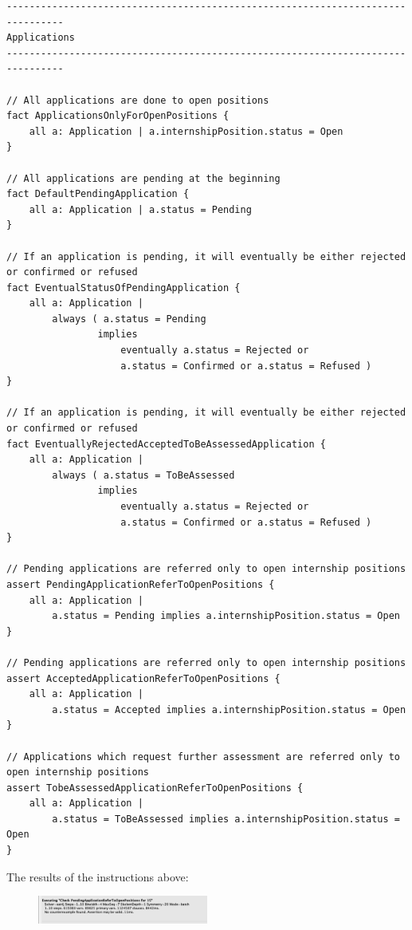 \begin{verbatim}
--------------------------------------------------------------------------------
Applications
--------------------------------------------------------------------------------

// All applications are done to open positions
fact ApplicationsOnlyForOpenPositions {
    all a: Application | a.internshipPosition.status = Open
}

// All applications are pending at the beginning
fact DefaultPendingApplication {
    all a: Application | a.status = Pending
}

// If an application is pending, it will eventually be either rejected or confirmed or refused
fact EventualStatusOfPendingApplication {
    all a: Application | 
        always ( a.status = Pending
                implies 
                    eventually a.status = Rejected or 
                    a.status = Confirmed or a.status = Refused )
}

// If an application is pending, it will eventually be either rejected or confirmed or refused
fact EventuallyRejectedAcceptedToBeAssessedApplication {
    all a: Application | 
        always ( a.status = ToBeAssessed
                implies 
                    eventually a.status = Rejected or 
                    a.status = Confirmed or a.status = Refused )
}

// Pending applications are referred only to open internship positions
assert PendingApplicationReferToOpenPositions {
    all a: Application | 
        a.status = Pending implies a.internshipPosition.status = Open
}

// Pending applications are referred only to open internship positions
assert AcceptedApplicationReferToOpenPositions {
    all a: Application | 
        a.status = Accepted implies a.internshipPosition.status = Open
}

// Applications which request further assessment are referred only to open internship positions
assert TobeAssessedApplicationReferToOpenPositions {
    all a: Application | 
        a.status = ToBeAssessed implies a.internshipPosition.status = Open
}
\end{verbatim}
The results of the instructions above:
\begin{figure}[h!]
    \centering\includegraphics[width=0.5\textwidth]{RASD/Images/Alloy/checkPendingApplicationsReferToOpenPositions.png}
    \label{fig:checkPendingApplicationsReferToOpenPositions}
\end{figure}
